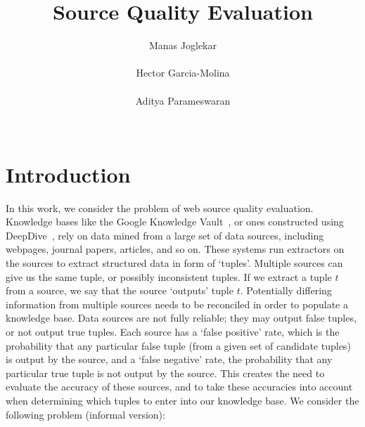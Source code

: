 \documentclass{sig-alternate}
\newcounter{prob}
\begin{document}
\title{Source Quality Evaluation}
\author{
\alignauthor
Manas Joglekar\\
       \\
\alignauthor
Hector Garcia-Molina\\
       \\
\alignauthor 
Aditya Parameswaran\\
       \\
}
\maketitle

\begin{abstract}
\end{abstract}


\section{Introduction}
In this work, we consider the problem of web source quality evaluation. Knowledge bases like the Google Knowledge Vault~\cite{Dong:2014:KVW:2623330.2623623}, or ones constructed using DeepDive~\cite{Niu_deepdive:web-scale}, rely on data mined from a large set of data sources, including webpages, journal papers, articles, and so on. These systems run extractors on the sources to extract structured data in form of `tuples'. Multiple sources can give us the same tuple, or possibly inconsistent tuples. If we extract a tuple $t$ from a source, we say that the source `outputs' tuple $t$. Potentially differing information from multiple sources needs to be reconciled in order to populate a knowledge base. Data sources are not fully reliable; they may output false tuples, or not output true tuples. Each source has a `false positive' rate, which is the probability that any particular false tuple (from a given set of candidate tuples) is output by the source, and a `false negative' rate, the probability that any particular true tuple is not output by the source. This creates the need to evaluate the accuracy of these sources, and to take these accuracies into account when determining which tuples to enter into our knowledge base. We consider the following problem (informal version):
\end{document}
